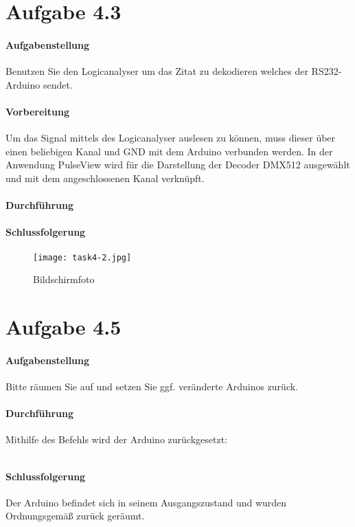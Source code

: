 \section{Aufgabe 4.3}
\paragraph{Aufgabenstellung}
Benutzen Sie den Logicanalyser um das Zitat zu dekodieren welches der RS232-Arduino sendet.

\paragraph{Vorbereitung}
Um das Signal mittels des Logicanalyser auslesen zu können, muss dieser über einen beliebigen Kanal und GND mit dem Arduino verbunden werden. In der Anwendung PulseView wird für die Darstellung der Decoder DMX512 ausgewählt und mit dem angeschlossenen Kanal verknüpft.

\paragraph{Durchführung}


\paragraph{Schlussfolgerung}


\begin{figure}
	\centering
	\texttt{[image: task4-2.jpg]}
	\caption{Bildschirmfoto}
	\label{task4-2}
\end{figure}





\section{Aufgabe 4.5}
\paragraph{Aufgabenstellung}
Bitte räumen Sie auf und setzen Sie ggf. veränderte Arduinos zurück.

\paragraph{Durchführung}
Mithilfe des Befehls wird der Arduino zurückgesetzt:

\inputminted[breaklines, fontsize=\fontsize{10pt}{10pt}]{bash}{../docs/reset-dmx.txt}

\paragraph{Schlussfolgerung}
Der Arduino befindet sich in seinem Ausgangszustand und wurden Ordnungsgemäß zurück geräumt.